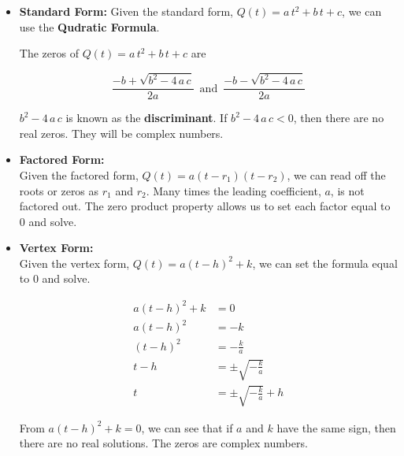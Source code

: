 \documentclass{ximera}
\begin{document}
\begin{itemize}

\item \textbf{\textcolor{purple!85!blue}{Standard Form:}}  Given the standard form, $Q(t) = a \, t^2 + b \, t + c$, we can use the \textbf{Qudratic Formula}.

The zeros of $Q(t) = a \, t^2 + b \, t + c$ are

\[   \frac{-b + \sqrt{b^2 - 4 \, a \, c}}{2a}      \, \text{ and } \,       \frac{-b - \sqrt{b^2 - 4 \, a \, c}}{2a}    \]



$b^2 - 4 \, a \, c$ is known as the \textbf{discriminant}. If $b^2 - 4 \, a \, c < 0$, then there are no real zeros.  They will be complex numbers.


\item \textbf{\textcolor{purple!85!blue}{Factored Form:}} \\ 
Given the factored form, $Q(t) = a (t - r_1)(t - r_2)$, we can read off the roots or zeros as $r_1$ and $r_2$. Many times the leading coefficient, $a$, is not factored out.  The zero product property allows us to set each factor equal to $0$ and solve.






\item  \textbf{\textcolor{purple!85!blue}{Vertex Form:}} \\
Given the vertex form, $Q(t) = a (t - h)^2 + k$, we can set the formula equal to $0$ and solve.



\begin{align*}
a (t - h)^2 + k    & = 0  \\
a (t - h)^2        & = -k  \\
(t - h)^2        & = -\frac{k}{a}  \\
t - h        & = \pm \sqrt{-\frac{k}{a}}  \\
t        & = \pm \sqrt{-\frac{k}{a}}  + h
\end{align*}

From $a (t - h)^2 + k  = 0$, we can see that if $a$ and $k$ have the same sign, then there are no real solutions.  The zeros are complex numbers.



\end{itemize}
\end{document}
